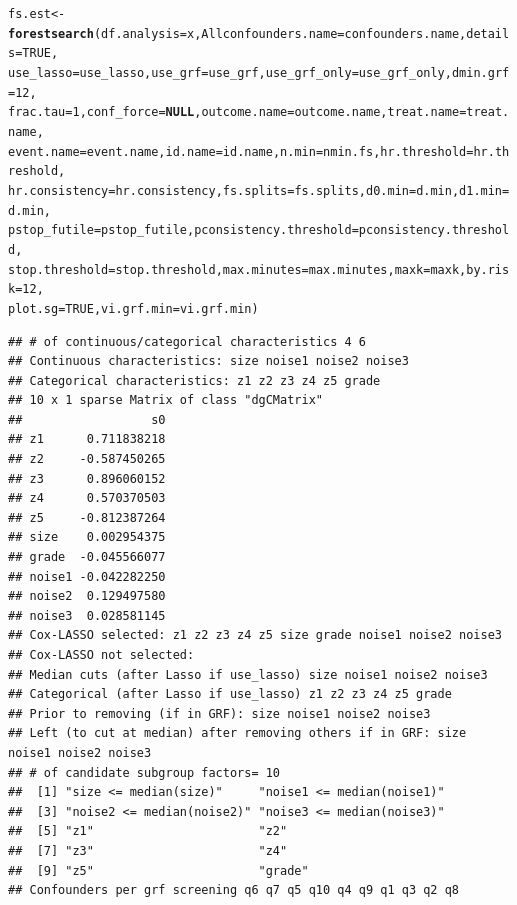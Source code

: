 \documentclass[smallextended]{svjour3}
\makeatletter
\newcommand{\hlnum}[1]{\textcolor[rgb]{0.686,0.059,0.569}{#1}}%
\newcommand{\hlstd}[1]{\textcolor[rgb]{0.345,0.345,0.345}{#1}}%
\newcommand{\hlkwa}[1]{\textcolor[rgb]{0.161,0.373,0.58}{\textbf{#1}}}%
\newcommand{\hlkwb}[1]{\textcolor[rgb]{0.69,0.353,0.396}{#1}}%
\newcommand{\hlkwc}[1]{\textcolor[rgb]{0.333,0.667,0.333}{#1}}%
\newcommand{\hlkwd}[1]{\textcolor[rgb]{0.737,0.353,0.396}{\textbf{#1}}}%
\newenvironment{kframe}{%
 \def\at@end@of@kframe{}%
 \ifinner\ifhmode%
  \def\at@end@of@kframe{\end{minipage}}%
  \begin{minipage}{\columnwidth}%
 \fi\fi%
 \def\FrameCommand##1{\hskip\@totalleftmargin \hskip-\fboxsep
 \colorbox{shadecolor}{##1}\hskip-\fboxsep
     \hskip-\linewidth \hskip-\@totalleftmargin \hskip\columnwidth}%
 \MakeFramed {\advance\hsize-\width
   \@totalleftmargin\z@ \linewidth\hsize
   \@setminipage}}%
 {\par\unskip\endMakeFramed%
 \at@end@of@kframe}
\newenvironment{knitrout}{}{} %
\makeatother
\begin{document}
\begin{knitrout}
\begin{kframe}
\begin{alltt}
\hlstd{fs.est} \hlkwb{<-} \hlkwd{forestsearch}\hlstd{(}\hlkwc{df.analysis} \hlstd{= x,} \hlkwc{Allconfounders.name} \hlstd{= confounders.name,} \hlkwc{details} \hlstd{=} \hlnum{TRUE}\hlstd{,}
    \hlkwc{use_lasso} \hlstd{= use_lasso,} \hlkwc{use_grf} \hlstd{= use_grf,} \hlkwc{use_grf_only} \hlstd{= use_grf_only,} \hlkwc{dmin.grf} \hlstd{=} \hlnum{12}\hlstd{,}
    \hlkwc{frac.tau} \hlstd{=} \hlnum{1}\hlstd{,} \hlkwc{conf_force} \hlstd{=} \hlkwa{NULL}\hlstd{,} \hlkwc{outcome.name} \hlstd{= outcome.name,} \hlkwc{treat.name} \hlstd{= treat.name,}
    \hlkwc{event.name} \hlstd{= event.name,} \hlkwc{id.name} \hlstd{= id.name,} \hlkwc{n.min} \hlstd{= nmin.fs,} \hlkwc{hr.threshold} \hlstd{= hr.threshold,}
    \hlkwc{hr.consistency} \hlstd{= hr.consistency,} \hlkwc{fs.splits} \hlstd{= fs.splits,} \hlkwc{d0.min} \hlstd{= d.min,} \hlkwc{d1.min} \hlstd{= d.min,}
    \hlkwc{pstop_futile} \hlstd{= pstop_futile,} \hlkwc{pconsistency.threshold} \hlstd{= pconsistency.threshold,}
    \hlkwc{stop.threshold} \hlstd{= stop.threshold,} \hlkwc{max.minutes} \hlstd{= max.minutes,} \hlkwc{maxk} \hlstd{= maxk,} \hlkwc{by.risk} \hlstd{=} \hlnum{12}\hlstd{,}
    \hlkwc{plot.sg} \hlstd{=} \hlnum{TRUE}\hlstd{,} \hlkwc{vi.grf.min} \hlstd{= vi.grf.min)}
\end{alltt}
\begin{verbatim}
## # of continuous/categorical characteristics 4 6 
## Continuous characteristics: size noise1 noise2 noise3 
## Categorical characteristics: z1 z2 z3 z4 z5 grade 
## 10 x 1 sparse Matrix of class "dgCMatrix"
##                  s0
## z1      0.711838218
## z2     -0.587450265
## z3      0.896060152
## z4      0.570370503
## z5     -0.812387264
## size    0.002954375
## grade  -0.045566077
## noise1 -0.042282250
## noise2  0.129497580
## noise3  0.028581145
## Cox-LASSO selected: z1 z2 z3 z4 z5 size grade noise1 noise2 noise3 
## Cox-LASSO not selected:  
## Median cuts (after Lasso if use_lasso) size noise1 noise2 noise3 
## Categorical (after Lasso if use_lasso) z1 z2 z3 z4 z5 grade 
## Prior to removing (if in GRF): size noise1 noise2 noise3 
## Left (to cut at median) after removing others if in GRF: size noise1 noise2 noise3 
## # of candidate subgroup factors= 10 
##  [1] "size <= median(size)"     "noise1 <= median(noise1)"
##  [3] "noise2 <= median(noise2)" "noise3 <= median(noise3)"
##  [5] "z1"                       "z2"                      
##  [7] "z3"                       "z4"                      
##  [9] "z5"                       "grade"                   
## Confounders per grf screening q6 q7 q5 q10 q4 q9 q1 q3 q2 q8 

\end{verbatim}
\end{kframe}
\end{knitrout}
\end{document}
